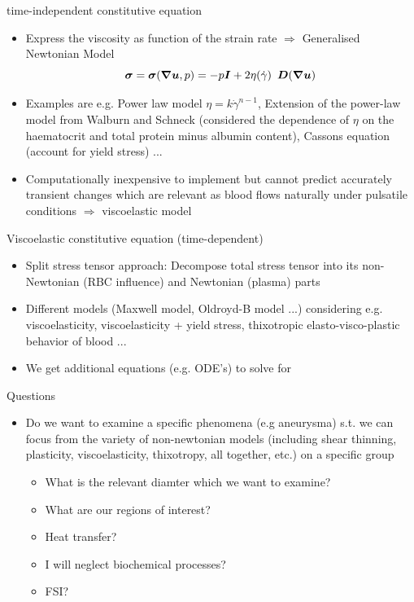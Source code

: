 \documentclass{beamer}
\begin{document}
	
		\begin{frame}{time-independent constitutive equation }
		\begin{itemize}
			\item Express the viscosity
as function of the strain rate $\Rightarrow$ Generalised Newtonian Model 
			\begin{equation}
			    \bm{\sigma} = \bm{\sigma}(\grad\bm{u},p)= -p\bm{I} +2\eta(\Dot{\gamma})\hspace{5pt} \bm{D}(\grad\bm{u})
			\end{equation}
			\item Examples are e.g. Power law model $\eta= k\Dot{\gamma}^{n-1}$, Extension of the power-law model from Walburn and Schneck (considered the dependence of $\eta$
on the haematocrit and total protein minus albumin content), Cassons equation (account for yield stress)  ...
			\item Computationally inexpensive to implement but cannot predict accurately
transient changes which are relevant as blood flows naturally under pulsatile conditions $\Rightarrow
$ viscoelastic model
		\end{itemize}
		
	\end{frame}

	\begin{frame}{Viscoelastic constitutive equation (time-dependent)}
		\begin{itemize}
		\item Split stress tensor approach: Decompose total stress tensor into its non-Newtonian (RBC influence) and Newtonian (plasma) parts 
			\item Different models (Maxwell model, Oldroyd-B model ...) considering e.g. viscoelasticity, viscoelasticity + yield stress, thixotropic elasto-visco-plastic behavior of blood ...
			\item We get additional equations (e.g. ODE's) to solve for
		\end{itemize}
		
	\end{frame}
	
	
	
	
	
	
	\begin{frame}{Questions}
		\begin{itemize}
		\item Do we want to examine a specific phenomena (e.g aneurysma) s.t. we can
focus from the variety of non-newtonian models (including shear thinning, plasticity, viscoelasticity, thixotropy, all together, etc.) on a specific group
\begin{itemize}
    \item What is the relevant diamter which we want to examine?
    \item What are our regions of interest?
    \item Heat transfer?
    \item I will neglect biochemical processes?
    \item FSI?
\end{itemize}
		\end{itemize}
		
	\end{frame}
	
\end{document}

